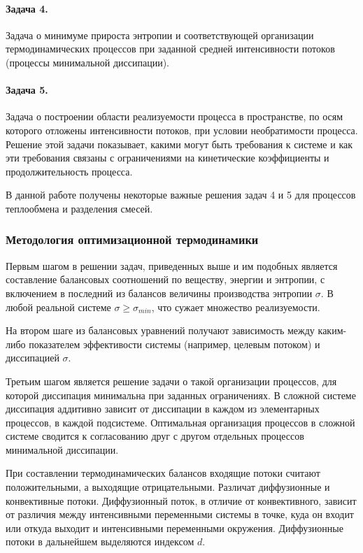 \documentclass{article}
\begin{document}
		\paragraph{Задача 4.} Задача о минимуме прироста энтропии и соответствующей организации термодинамических процессов при заданной средней интенсивности потоков (процессы минимальной диссипации).
		
		\paragraph{Задача 5.} Задача о построении области реализуемости процесса в пространстве, по осям которого отложены интенсивности потоков, при условии необратимости процесса. Решение этой задачи показывает, какими могут быть  требования к системе и как эти требования  связаны с ограничениями на кинетические коэффициенты и продолжительность процесса.
		
		В данной работе получены некоторые важные решения задач 4 и 5 для процессов теплообмена и разделения смесей.
		
		\subsubsection{Методология оптимизационной термодинамики}
		
		Первым шагом в решении задач, приведенных выше и им подобных является составление балансовых соотношений по веществу, энергии и энтропии, с включением в последний из балансов величины производства энтропии $\sigma$. В любой реальной системе $\sigma \geq \sigma_{min}$, что сужает множество реализуемости.
		
		На втором шаге из балансовых уравнений получают зависимость между каким-либо показателем эффективости системы (например, целевым потоком) и диссипацией $\sigma$.
		
		Третьим шагом является решение задачи о такой организации процессов, для которой диссипация минимальна при заданных ограничениях. В сложной системе диссипация аддитивно зависит от диссипации в каждом из элементарных процессов, в каждой подсистеме. Оптимальная организация процессов в сложной системе сводится к согласованию друг с другом отдельных процессов минимальной диссипации.
		
		При составлении термодинамических балансов входящие потоки считают положительными, а выходящие отрицательными. Различат диффузионные и конвективные потоки. Диффузионный поток, в отличие от конвективного, зависит от различия между интенсивными переменными системы в точке, куда он входит или откуда выходит и интенсивными переменными окружения. Диффузионные потоки в дальнейшем выделяются индексом $d$.
		
\end{document}
